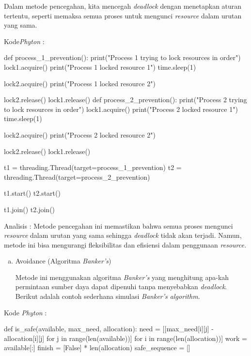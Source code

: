 \documentclass[12pt]{article}
\begin{document}
\begin{enumerate}
\begin{enumerate}[a.]
        Dalam metode pencegahan, kita mencegah \textit{deadlock} dengan menetapkan aturan tertentu, seperti memaksa semua proses untuk mengunci \textit{resource} dalam urutan yang sama.
    \end{enumerate}

    Kode\textit{Phyton} :

    \begin{python}
def process_1_prevention():
    print("Process 1 trying to lock resources in order")
    lock1.acquire()
    print("Process 1 locked resource 1")
    time.sleep(1)
    
    lock2.acquire()
    print("Process 1 locked resource 2")
    
    lock2.release()
    lock1.release()
def process_2_prevention():
    print("Process 2 trying to lock resources in order")
    lock1.acquire()
    print("Process 2 locked resource 1")
    time.sleep(1)
    
    lock2.acquire()
    print("Process 2 locked resource 2")
    
    lock2.release()
    lock1.release()

t1 = threading.Thread(target=process_1_prevention)
t2 = threading.Thread(target=process_2_prevention)

t1.start()
t2.start()

t1.join()
t2.join()
    \end{python}

    Analisis : Metode pencegahan ini memastikan bahwa semua proses mengunci \textit{resource} dalam urutan yang sama sehingga \textit{deadlock} tidak akan terjadi. Namun, metode ini bisa mengurangi fleksibilitas dan efisiensi dalam penggunaan \textit{resource.}

    \begin{enumerate}[b.]
        \item {Avoidance} (Algoritma \textit{Banker's})

        Metode ini menggunakan algoritma \textit{Banker's} yang menghitung apa-kah permintaan sumber daya dapat dipenuhi tanpa menyebabkan \textit{deadlock}. Berikut adalah contoh sederhana simulasi \textit{Banker's algorithm.}
    \end{enumerate}

        Kode \textit{Phyton} :

        \begin{python}
def is_safe(available, max_need, allocation):
    need = [[max_need[i][j] - allocation[i][j] for j in range(len(available))] for i in range(len(allocation))]
    work = available[:]
    finish = [False] * len(allocation)
    safe_sequence = []


\end{python}
\end{enumerate}
\end{document}
